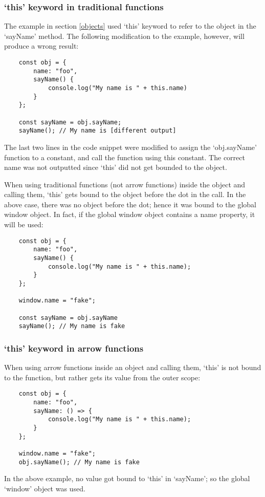 \documentclass[11pt,a4paper]{article}
\begin{document}
\subsubsection{`this' keyword in traditional functions}
The example in section \ref{objects} used `this' keyword to refer to the object in the `sayName' method.
The following modification to the example, however, will produce a wrong result:
\begin{verbatim}
    const obj = {
        name: "foo",
        sayName() {
            console.log("My name is " + this.name)
        }
    };

    const sayName = obj.sayName;
    sayName(); // My name is [different output]
\end{verbatim}

The last two lines in the code snippet were modified to assign the `obj.sayName' function to a constant,
and call the function using this constant.
The correct name was not outputted since `this' did not get bounded to the object.

When using traditional functions (not arrow functions) inside the object and calling them,
`this' gets bound to the object before the dot in the call.
In the above case, there was no object before the dot; hence it was bound to the global window object.
In fact, if the global window object contains a name property, it will be used:
\begin{verbatim}
    const obj = {
        name: "foo",
        sayName() {
            console.log("My name is " + this.name);
        }
    };

    window.name = "fake";

    const sayName = obj.sayName
    sayName(); // My name is fake
\end{verbatim}

\subsubsection{`this' keyword in arrow functions}
When using arrow functions inside an object and calling them, `this' is not bound to the function,
but rather gets its value from the outer scope:

\begin{verbatim}
    const obj = {
        name: "foo",
        sayName: () => {
            console.log("My name is " + this.name);
        }
    };

    window.name = "fake";
    obj.sayName(); // My name is fake
\end{verbatim}
In the above example, no value got bound to `this' in `sayName'; so the global `window' object was used.
\end{document}

